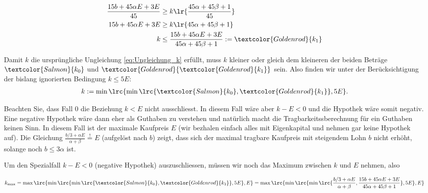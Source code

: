 {\begin{myanswer}
\begin{enumerate}
\begin{description}
\begin{align*}
					            \frac{15b + 45\alpha E + 3E}{45}      & \geq k\lr{\frac{45\alpha + 45\beta + 1}{45}}                                            \\
					            15b + 45\alpha E + 3E                 & \geq k\lr{45\alpha + 45\beta + 1}                                                       \\
					            k                                     & \leq \frac{15b + 45\alpha E + 3E}{45\alpha + 45\beta + 1} := \textcolor{Goldenrod}{k_1}
				            \end{align*}
			      \end{description}
			      Damit $k$ die ursprüngliche Ungleichung \ref{eq:Ungleichung_k} erfüllt, muss $k$ kleiner oder gleich dem kleineren der beiden Beträge $\textcolor{Salmon}{k_0}$ und $\textcolor{Goldenrod}{\textcolor{Goldenrod}{k_1}}$ sein. Also finden wir unter der Berücksichtigung der bislang ignorierten Bedingung $k \leq 5E$:
			      \begin{align*}
				      k := \min\lrc{\min\lrc{\textcolor{Salmon}{k_0}, \textcolor{Goldenrod}{k_1}}, 5E}.
			      \end{align*}

			      Beachten Sie, dass Fall 0 die Beziehung $k < E$ nicht ausschliesst. In diesem Fall wäre aber $k - E < 0$ und die Hypothek wäre somit negativ. Eine negative Hypothek wäre dann eher als Guthaben zu verstehen und natürlich macht die Tragbarkeitssberechnung für ein Guthaben keinen Sinn. In diesem Fall ist der maximale Kaufpreis $E$ (wir bezhalen einfach alles mit Eigenkapital und nehmen gar keine Hypothek auf). Die Gleichung $\frac{b/3 + \alpha E}{\alpha + \beta} \stackrel{!}{=} E$ (aufgelöst nach $b$) zeigt, dass sich der maximal tragbare Kaufpreis mit steigendem Lohn $b$ nicht erhöht, solange noch $b \leq 3\alpha$ ist.

			      Um den Spezialfall $k - E < 0$ (negative Hypothek) auszuschliessen, müssen wir noch das Maximum zwischen $k$ und $E$ nehmen, also
			      \begin{mysummary}
				      {\scriptsize
					      \begin{align*}
						      k_{\text{max}} = \max\lrc{\min\lrc{\min\lrc{\textcolor{Salmon}{k_0}, \textcolor{Goldenrod}{k_1}}, 5E}, E} = \max\lrc{\min\lrc{\min\lrc{\frac{b/3 + \alpha E}{\alpha + \beta}, \frac{15b + 45\alpha E + 3E}{45\alpha + 45\beta + 1}}, 5E}, E}
					      \end{align*}
				      }
			      \end{mysummary}


\end{enumerate}
\end{myanswer}}
